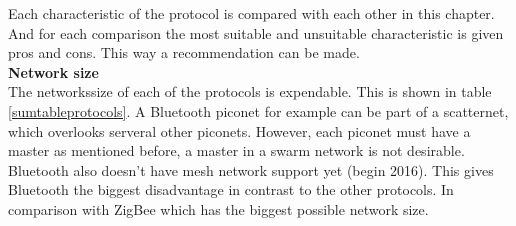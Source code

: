 \documentclass[10pt,a4paper]{article}
\begin{document}
\begin{table}[H]
\centering
\caption{A table with a summerazing of the protocols. The table is based on information from \cite{comparitivestudywirelessprotocols}. Infrared is not included due to the line of sight problem.}
\label{sumtableprotocols}
\end{table}

Each characteristic of the protocol is compared with each other in this chapter. And for each comparison the most suitable and unsuitable characteristic is given pros and cons. This way a recommendation can be made.\\

\textbf{\large Network size}\\
The networkssize of each of the protocols is expendable. This is shown in table \ref{sumtableprotocols}. A Bluetooth piconet for example can be part of a scatternet, which overlooks serveral other piconets. However, each piconet must have a master as mentioned before, a master in a swarm network is not desirable. Bluetooth also doesn't have mesh network support yet (begin 2016). \cite{bluetoothmesh} This gives Bluetooth the biggest disadvantage in contrast to the other protocols. In comparison with ZigBee which has the biggest possible network size.\\
\end{document}
